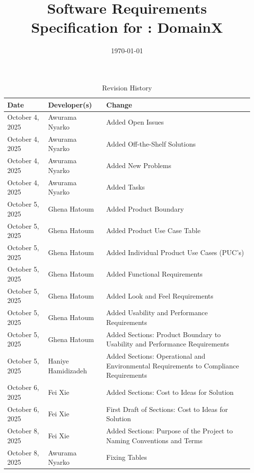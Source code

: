 \documentclass[12pt]{article}
\begin{document}
\title{Software Requirements Specification for \progname: DomainX} 
\author{\authname}
\date{\today}
	
\maketitle

\begin{table}[hp]
\caption{Revision History} \label{TblRevisionHistory}
\begin{tabularx}{\textwidth}{llX}
\toprule
\textbf{Date} & \textbf{Developer(s)} & \textbf{Change}\\
\midrule
October 4, 2025 & Awurama Nyarko & Added Open Issues\\
October 4, 2025 & Awurama Nyarko & Added Off-the-Shelf Solutions\\
October 4, 2025 & Awurama Nyarko & Added New Problems\\
October 4, 2025 & Awurama Nyarko & Added Tasks\\
October 5, 2025 & Ghena Hatoum & Added Product Boundary \\
October 5, 2025 & Ghena Hatoum & Added Product Use Case Table \\
October 5, 2025 & Ghena Hatoum & Added Individual Product Use Cases (PUC's) \\
October 5, 2025 & Ghena Hatoum & Added Functional Requirements \\
October 5, 2025 & Ghena Hatoum & Added Look and Feel Requirements \\
October 5, 2025 & Ghena Hatoum & Added Usability and Performance Requirements \\
October 5, 2025 & Ghena Hatoum & Added Sections: Product Boundary to Usability and Performance Requirements\\
October 5, 2025 & Haniye Hamidizadeh & Added Sections: Operational and Environmental Requirements to Compliance Requirements\\
October 6, 2025 & Fei Xie & Added Sections: Cost to Ideas for Solution\\
October 6, 2025 & Fei Xie & First Draft of Sections: Cost to Ideas for Solution\\
October 8, 2025 & Fei Xie & Added Sections: Purpose of the Project to Naming Conventions and Terms\\
October 8, 2025 & Awurama Nyarko & Fixing Tables\\
\bottomrule
\end{tabularx}
\end{table}
\end{document}
